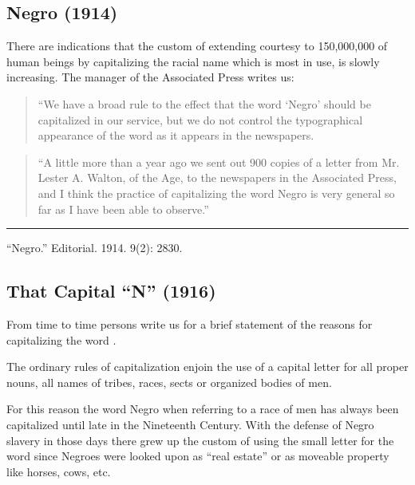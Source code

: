 \documentclass[letterpaper,10pt,english]{jupyterBook}
\begin{document}
\subsection{Negro (1914)}
\label{\detokenize{Volumes/09/02/negro:negro-1914}}\label{\detokenize{Volumes/09/02/negro::doc}}
\sphinxAtStartPar
There are indications that the custom of extending courtesy to 150,000,000 of human beings by capitalizing the racial name which is most in use, is slowly increasing. The manager of the  Associated Press writes us:
\begin{quote}

\sphinxAtStartPar
“We have a broad rule to the effect that the word ‘Negro’ should be capitalized in our service, but we do not control the typographical appearance of the word as it appears in the newspapers.
\end{quote}
\begin{quote}

\sphinxAtStartPar
“A little more than a year ago we sent out 900 copies of a letter from Mr. Lester A. Walton, of the Age, to the newspapers in the Associated Press, and I think the practice of capitalizing the word Negro is very general so far as I have been able to observe.”
\end{quote}


\bigskip\hrule\bigskip


\sphinxAtStartPar
“Negro.” Editorial. 1914.  9(2): 28\sphinxhyphen{}30.


\subsection{That Capital “N” (1916)}
\label{\detokenize{Volumes/11/04/that_capital_n:that-capital-n-1916}}\label{\detokenize{Volumes/11/04/that_capital_n::doc}}
\sphinxAtStartPar
From time to time persons write us for a brief statement of the reasons for capitalizing the word .

\sphinxAtStartPar
The ordinary rules of capitalization enjoin the use of a capital letter for all proper nouns, all names of tribes, races, sects or organized bodies of men.

\sphinxAtStartPar
For this reason the word Negro when referring to a race of men has always been capitalized until late in the Nineteenth Century. With the defense of Negro slavery in those days there grew up the custom of using the small letter for the word since Negroes were looked upon as “real estate” or as moveable property like horses, cows, etc.
\end{document}
